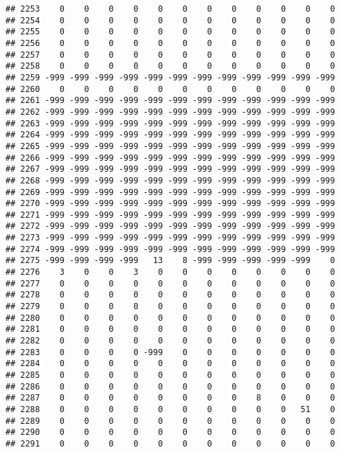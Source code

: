 \documentclass[]{article}
\begin{document}
\begin{verbatim}
## 2253    0    0    0    0    0    0    0    0    0    0    0    0
## 2254    0    0    0    0    0    0    0    0    0    0    0    0
## 2255    0    0    0    0    0    0    0    0    0    0    0    0
## 2256    0    0    0    0    0    0    0    0    0    0    0    0
## 2257    0    0    0    0    0    0    0    0    0    0    0    0
## 2258    0    0    0    0    0    0    0    0    0    0    0    0
## 2259 -999 -999 -999 -999 -999 -999 -999 -999 -999 -999 -999 -999
## 2260    0    0    0    0    0    0    0    0    0    0    0    0
## 2261 -999 -999 -999 -999 -999 -999 -999 -999 -999 -999 -999 -999
## 2262 -999 -999 -999 -999 -999 -999 -999 -999 -999 -999 -999 -999
## 2263 -999 -999 -999 -999 -999 -999 -999 -999 -999 -999 -999 -999
## 2264 -999 -999 -999 -999 -999 -999 -999 -999 -999 -999 -999 -999
## 2265 -999 -999 -999 -999 -999 -999 -999 -999 -999 -999 -999 -999
## 2266 -999 -999 -999 -999 -999 -999 -999 -999 -999 -999 -999 -999
## 2267 -999 -999 -999 -999 -999 -999 -999 -999 -999 -999 -999 -999
## 2268 -999 -999 -999 -999 -999 -999 -999 -999 -999 -999 -999 -999
## 2269 -999 -999 -999 -999 -999 -999 -999 -999 -999 -999 -999 -999
## 2270 -999 -999 -999 -999 -999 -999 -999 -999 -999 -999 -999 -999
## 2271 -999 -999 -999 -999 -999 -999 -999 -999 -999 -999 -999 -999
## 2272 -999 -999 -999 -999 -999 -999 -999 -999 -999 -999 -999 -999
## 2273 -999 -999 -999 -999 -999 -999 -999 -999 -999 -999 -999 -999
## 2274 -999 -999 -999 -999 -999 -999 -999 -999 -999 -999 -999 -999
## 2275 -999 -999 -999 -999   13    8 -999 -999 -999 -999 -999    0
## 2276    3    0    0    3    0    0    0    0    0    0    0    0
## 2277    0    0    0    0    0    0    0    0    0    0    0    0
## 2278    0    0    0    0    0    0    0    0    0    0    0    0
## 2279    0    0    0    0    0    0    0    0    0    0    0    0
## 2280    0    0    0    0    0    0    0    0    0    0    0    0
## 2281    0    0    0    0    0    0    0    0    0    0    0    0
## 2282    0    0    0    0    0    0    0    0    0    0    0    0
## 2283    0    0    0    0 -999    0    0    0    0    0    0    0
## 2284    0    0    0    0    0    0    0    0    0    0    0    0
## 2285    0    0    0    0    0    0    0    0    0    0    0    0
## 2286    0    0    0    0    0    0    0    0    0    0    0    0
## 2287    0    0    0    0    0    0    0    0    8    0    0    0
## 2288    0    0    0    0    0    0    0    0    0    0   51    0
## 2289    0    0    0    0    0    0    0    0    0    0    0    0
## 2290    0    0    0    0    0    0    0    0    0    0    0    0
## 2291    0    0    0    0    0    0    0    0    0    0    0    0

\end{verbatim}
\end{document}
